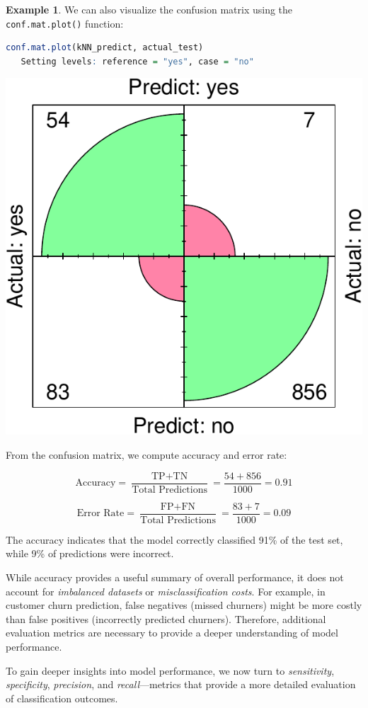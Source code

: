 \documentclass[
]{book}
\newcommand{\passthrough}[1]{#1}
\theoremstyle{definition}
\theoremstyle{definition}
\newtheorem{example}{Example}[chapter]
\theoremstyle{definition}
\theoremstyle{definition}
\theoremstyle{remark}
\begin{document}
\begin{example}
We can also visualize the confusion matrix using the \passthrough{\lstinline!conf.mat.plot()!} function:

\begin{lstlisting}[language=R]
conf.mat.plot(kNN_predict, actual_test)
   Setting levels: reference = "yes", case = "no"
\end{lstlisting}

\begin{center}\includegraphics[width=0.6\linewidth]{evaluation_files/figure-latex/unnamed-chunk-4-1} \end{center}

From the confusion matrix, we compute accuracy and error rate:

\[
\text{Accuracy} = \frac{\text{TP} + \text{TN}}{\text{Total Predictions}} = \frac{54 + 856}{1000} = 0.91
\]

\[
\text{Error Rate} = \frac{\text{FP} + \text{FN}}{\text{Total Predictions}} = \frac{83 + 7}{1000} = 0.09
\]

The accuracy indicates that the model correctly classified 91\% of the test set, while 9\% of predictions were incorrect.
\end{example}

While accuracy provides a useful summary of overall performance, it does not account for \emph{imbalanced datasets} or \emph{misclassification costs}. For example, in customer churn prediction, false negatives (missed churners) might be more costly than false positives (incorrectly predicted churners). Therefore, additional evaluation metrics are necessary to provide a deeper understanding of model performance.

To gain deeper insights into model performance, we now turn to \emph{sensitivity}, \emph{specificity}, \emph{precision}, and \emph{recall}---metrics that provide a more detailed evaluation of classification outcomes.
\end{document}
